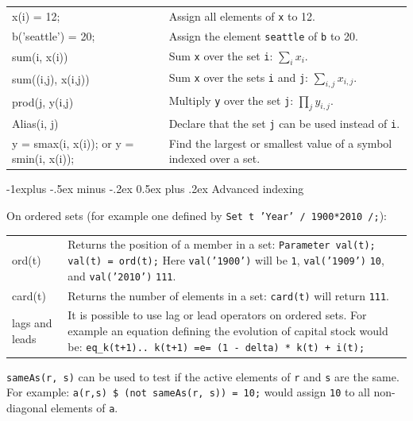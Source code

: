 \documentclass[10pt,landscape,a4paper]{article}
\makeatletter
\renewcommand{\subsection}{\@startsection{subsection}{2}{0mm}%
                                {-1explus -.5ex minus -.2ex}%
                                {0.5ex plus .2ex}%
                                {\normalfont\normalsize\bfseries}}
\makeatother
\begin{document}
\begin{multicols}{2}
\begin{tabularx}{\columnwidth}{@{}>{\ttfamily}lX@{}}
x(i) = 12; & Assign all elements of \texttt{x} to 12.\\
b('seattle') = 20; & Assign the element \texttt{seattle} of \texttt{b} to 20.\\
sum(i, x(i)) & Sum \texttt{x} over the set \texttt{i}: $\sum_{i}x_{i}$.\\
sum((i,j), x(i,j)) & Sum \texttt{x} over the sets \texttt{i} and \texttt{j}: $\sum_{i,j}x_{i,j}$.\\
prod(j, y(i,j) & Multiply \texttt{y} over the set \texttt{j}:
$\prod_{j}y_{i,j}$.\\
Alias(i, j) & Declare that the set \texttt{j} can be used instead of
\texttt{i}.\\
y = smax(i, x(i)); \textrm{or} y = smin(i, x(i)); & Find the largest or smallest
value of a symbol indexed over a set.
\end{tabularx}

\subsection{Advanced indexing}

On ordered sets (for example one defined by \texttt{Set t 'Year' / 1900*2010 /;}):
\begin{tabularx}{\columnwidth}{@{}>{\ttfamily}l>{\raggedright\arraybackslash}X@{}}
ord(t)& Returns the position of a member in a set:\linebreak{}
\texttt{Parameter val(t);}\linebreak{}
\texttt{val(t) = ord(t);}\linebreak{}
Here \texttt{val('1900')} will be \texttt{1}, \texttt{val('1909')} \texttt{10}, and \texttt{val('2010')} \texttt{111}.\\
card(t) & Returns the number of elements in a set: \texttt{card(t)} will return \texttt{111}.\\
\textrm{lags and leads} & It is possible to use lag or lead operators on ordered
sets. For example an equation defining the evolution of capital stock would
be:\linebreak{}
\texttt{eq\_k(t+1).. k(t+1) =e= (1 - delta) * k(t) + i(t);}
\end{tabularx}

\texttt{sameAs(r, s)} can be used to test if the active elements of \texttt{r}
and \texttt{s} are the same. For example: \texttt{a(r,s) \$ (not sameAs(r, s)) =
  10;} would assign \texttt{10} to all non-diagonal elements of \texttt{a}.


\end{multicols}
\end{document}
